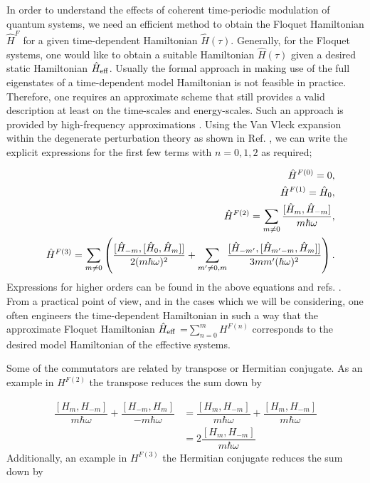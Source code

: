 In order to understand the effects of coherent time-periodic modulation of quantum systems, we need an efficient method to obtain the Floquet
Hamiltonian $\hat{H}^{F}$ for a given time-dependent Hamiltonian $\hat{H} (\tau )$. Generally, for the Floquet systems, one would like to obtain a
suitable Hamiltonian $\hat{H}(\tau )$ given a desired static Hamiltonian $\hat{H}_{\rm eff}$. Usually the formal approach in making use of the
full eigenstates of a time-dependent model Hamiltonian is not feasible in practice. Therefore, one requires an approximate scheme that still provides
a valid description at least on the time-scales and energy-scales. Such an approach is provided by high-frequency approximations \cite{JHS,HSA,MGP,MBL,AEE,NGJ}.
Using the Van Vleck expansion within the degenerate perturbation theory as shown in Ref. \cite{AEE}, we can write the explicit expressions for the first few terms with $n=0,1,2$ as required;

\begin{eqnarray} \label{eq:44}
&&\hat{H}^{F(0)}=0,  \\
&&\hat{H}^{F(1)}=\hat{H}_{0},  \\
&&\hat{H}^{F(2)} =\sum_{m\neq 0}\frac{[\hat{H}_{m},\hat{H}_{-m}]}{m\hbar \omega }
\notag,\\
&&\hat{H}^{F(3)}={\displaystyle\sum_{m\neq0}}
\left(  \frac{[\hat{H}_{-m},[\hat{H}_{0},\hat{H}_{m}]]}{2(m\hbar\omega)^{2}
}+{\displaystyle\sum_{m^{\prime}\neq0,m}}
\frac{[\hat{H}_{-m^{\prime}},[\hat{H}_{m^{\prime}-m},\hat{H}_{m}
]]}{3mm^{\prime}(\hbar\omega)^{2}}\right)\notag.
\end{eqnarray}
Expressions for higher orders can be found in the above equations and refs. \cite{JHS,HSA,MGP,MBL,AEE,NGJ}. From a practical
point of view, and in the cases which we will be considering, one often engineers the time-dependent Hamiltonian in such a way that the approximate
Floquet Hamiltonian $\hat{H}_{\rm eff}$ =$\sum_{n=0}^{m}H^{F(n)}$ corresponds to the desired model Hamiltonian of the effective systems.

Some of the commutators are related by transpose or Hermitian conjugate.
As an example in $H^{F(2)}$ the transpose reduces the sum down by

\begin{align}
  \dfrac{[H_m,H_{-m}]}{m\hbar \omega} + \dfrac{[H_{-m}, H_m]}{-m\hbar\omega} &= \dfrac{[H_m,H_{-m}]}{m\hbar \omega} + \dfrac{[H_m, H_{-m}]}{m\hbar\omega} \\
  &= 2\dfrac{[H_m,H_{-m}]}{m\hbar \omega}
\end{align}
Additionally, an example in $H^{F(3)}$ the Hermitian conjugate reduces the sum down by

